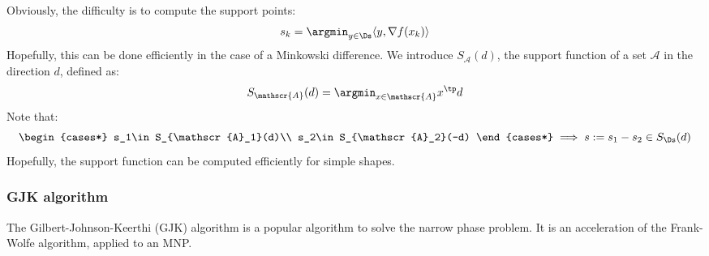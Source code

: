 Obviously, the difficulty is to compute the support points:
\begin{equation*}
    s_k = \argmin_{y\in\Ds} \langle y, \nabla f(x_k)\rangle
\end{equation*}
Hopefully, this can be done efficiently in the case of a Minkowski difference. We introduce $S_{\mathscr{A}}(d)$, the support function of a set $\mathscr{A}$ in the direction $d$, defined as:
\begin{equation*}
    S_{\mathscr{A}}(d)=\argmin_{x\in\mathscr{A}}x^\tp d
\end{equation*}
Note that:
\begin{equation*}
    \begin{cases*}
        s_1\in S_{\mathscr{A}_1}(d)\\
        s_2\in S_{\mathscr{A}_2}(-d)
    \end{cases*}
    \implies 
    s:=s_1-s_2\in S_{\Ds}(d)
\end{equation*}
Hopefully, the support function can be computed efficiently for simple shapes.

\subsubsection{GJK algorithm}
The Gilbert-Johnson-Keerthi (GJK) algorithm is a popular algorithm to solve the narrow phase problem. It is an acceleration of the Frank-Wolfe algorithm, applied to an MNP.